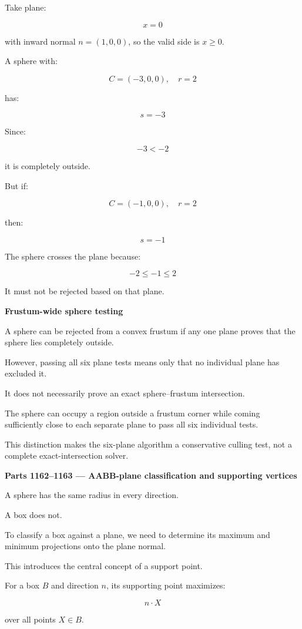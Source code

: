 Take plane:

\[
x=0
\]

with inward normal \(n=(1,0,0)\), so the valid side is \(x\ge0\).

A sphere with:

\[
C=(-3,0,0),\quad r=2
\]

has:

\[
s=-3
\]

Since:

\[
-3<-2
\]

it is completely outside.

But if:

\[
C=(-1,0,0),\quad r=2
\]

then:

\[
s=-1
\]

The sphere crosses the plane because:

\[
-2\le-1\le2
\]

It must not be rejected based on that plane.

\textbf{Frustum-wide sphere testing}

A sphere can be rejected from a convex frustum if any one plane proves that the sphere lies completely outside.

However, passing all six plane tests means only that no individual plane has excluded it.

It does not necessarily prove an exact sphere--frustum intersection.

The sphere can occupy a region outside a frustum corner while coming sufficiently close to each separate plane to pass all six individual tests.

This distinction makes the six-plane algorithm a conservative culling test, not a complete exact-intersection solver.

\textbf{Parts 1162--1163 --- AABB-plane classification and supporting vertices}

A sphere has the same radius in every direction.

A box does not.

To classify a box against a plane, we need to determine its maximum and minimum projections onto the plane normal.

This introduces the central concept of a support point.

For a box \(B\) and direction \(n\), its supporting point maximizes:

\[
n\cdot X
\]

over all points \(X\in B\).

